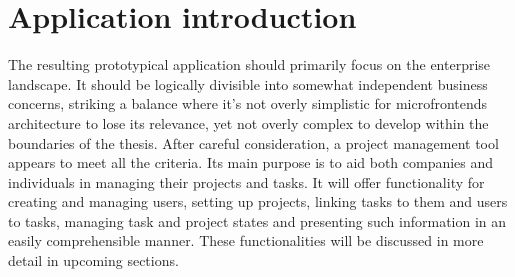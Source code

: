 \section{Application introduction}
The resulting prototypical application should primarily focus on the enterprise landscape. It should be logically divisible into somewhat independent business concerns, striking a balance where it's not overly simplistic for microfrontends architecture to lose its relevance, yet not overly complex to develop within the boundaries of the thesis. After careful consideration, a project management tool appears to meet all the criteria. Its main purpose is to aid both companies and individuals in managing their projects and tasks. It will offer functionality for creating and managing users, setting up projects, linking tasks to them and users to tasks, managing task and project states and presenting such information in an easily comprehensible manner. These functionalities will be discussed in more detail in upcoming sections.